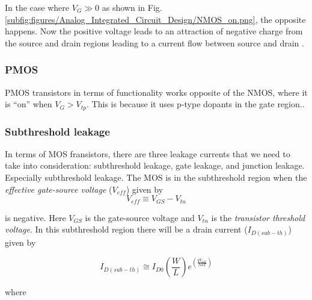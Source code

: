 In the case where $V_G\gg0$ as shown in Fig. \ref{subfig:figures/Analog_Integrated_Circuit_Design/NMOS_on.png}, the opposite happens. Now the positive voltage leads to an attraction of negative charge from the source and drain regions leading to a current flow between source and drain \cite[p. 16]{carusone_2012_analog}.




\subsubsection{PMOS}
PMOS transistors in terms of functionality works opposite of the NMOS, where it is ``on'' when $V_G > V_{tp}$. This is because it uses p-type dopants in the gate region.\cite{a2023_definition}.

\subsubsection{Subthreshold leakage}
In terms of MOS fransistors, there are three leakage currents that we need to take into consideration: subthreshold leakage, gate leakage, and junction leakage. \cite[p. 42]{carusone_2012_analog} Especially subthreshold leakage. The MOS is in the subthreshold region when the \textit{effective gate-source voltage} ($V_{eff}$) \cite[p. 17]{carusone_2012_analog} given by
\begin{equation}
    V_{eff}\equiv V_{GS}-V_{tn}
    \label{eq:effective_gate-source_voltage}
\end{equation}

is negative. Here $V_{GS}$ is the gate-source voltage and $V_{tn}$ is the \textit{transistor threshold voltage}. In this subthreshold region there will be a drain current ($I_{D(sub-th)}$) given by

\begin{equation}
    I_{D(sub-th)}\cong I_{D0} \left(\frac{W}{L}\right) e^{(\frac{qV_{eff}}{NkT})}
    \label{eq:subthreshold_current}
\end{equation}

where

